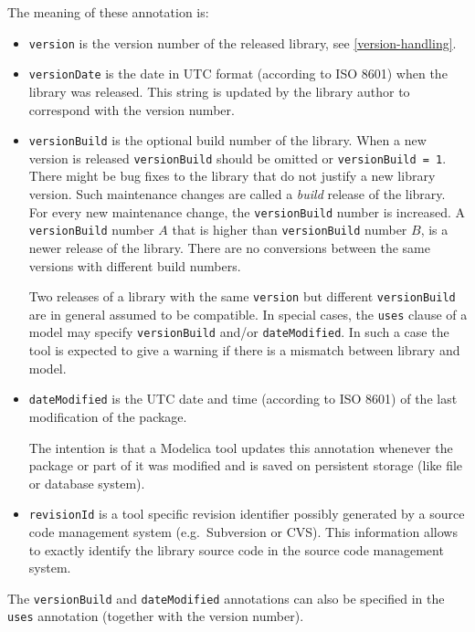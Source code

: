 The meaning of these annotation is:
\begin{itemize}
\item
  \lstinline!version! is the version number of the released library,
  see \cref{version-handling}.
\item
  \lstinline!versionDate! is the date in UTC format (according to ISO
  8601) when the library was released. This string is updated by the
  library author to correspond with the version number.
\item
  \lstinline!versionBuild! is the optional build number of the library.
  When a new version is released \lstinline!versionBuild! should be omitted or
  \lstinline!versionBuild = 1!. There might be bug fixes to the library that do
  not justify a new library version. Such maintenance changes are called
  a \emph{build} release of the library. For every new maintenance change,
  the \lstinline!versionBuild! number is increased. A \lstinline!versionBuild! number $A$
  that is higher than \lstinline!versionBuild! number $B$, is a newer release of the
  library. There are no conversions between the same versions with
  different build numbers.

  Two releases of a library with the same \lstinline!version! but different
  \lstinline!versionBuild! are in general assumed to be compatible. In special
  cases, the \lstinline!uses! clause of a model may specify \lstinline!versionBuild! and/or
  \lstinline!dateModified!.  In such a case the tool is expected to give
  a warning if there is a mismatch between library and model.
\item
  \lstinline!dateModified! is the UTC date and time (according to ISO
  8601) of the last modification of the package.

  \begin{nonnormative}
  The intention is that a Modelica tool updates this annotation whenever the package or part of it was modified and is saved on
  persistent storage (like file or database system).
  \end{nonnormative}
\item
  \lstinline!revisionId! is a tool specific revision identifier
  possibly generated by a source code management system (e.g.\ Subversion
  or CVS). This information allows to exactly identify the library
  source code in the source code management system.
\end{itemize}

The \lstinline!versionBuild! and \lstinline!dateModified! annotations can also be specified in
the \lstinline!uses! annotation (together with the version number).


